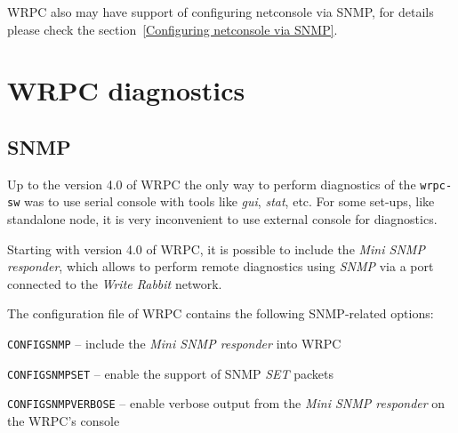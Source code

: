 \documentclass[a4paper, 12pt]{article}
\renewcommand{\_}{\underscore\allowbreak}
\begin{document}
WRPC also may have support of configuring netconsole via SNMP, for details
please check the section~\ref{Configuring netconsole via SNMP}.

\newpage
\section{WRPC diagnostics}
\subsection{SNMP}
\label{Diagnostics via SNMP}

Up to the version 4.0 of WRPC the only way to perform diagnostics
of the \texttt{wrpc-sw} was to use serial console with tools like \textit{gui}, \textit{stat},
etc. For some set-ups, like standalone node, it is very inconvenient to use
external console for diagnostics.

Starting with version 4.0 of WRPC, it is possible to include the \textit{Mini
SNMP responder}, which allows to perform remote diagnostics using \textit{SNMP} via
a port connected to the \textit{Write Rabbit} network.

The configuration file of WRPC contains the following
SNMP-related options:
\begin{itemize*}
\item \texttt{CONFIG\_SNMP} -- include the \textit{Mini SNMP responder} into WRPC
\item \texttt{CONFIG\_SNMP\_SET} -- enable the support of SNMP \textit{SET} packets
\item \texttt{CONFIG\_SNMP\_VERBOSE} -- enable verbose output from the \textit{Mini SNMP
      responder} on the WRPC's console
\end{itemize*}
\end{document}
